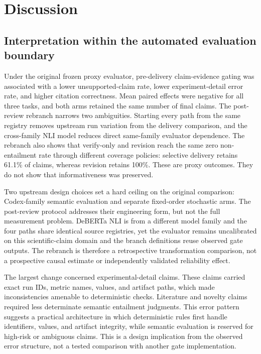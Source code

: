 \documentclass[11pt]{article}
\begin{document}
\section{Discussion}

\subsection{Interpretation within the automated evaluation boundary}

Under the original frozen proxy evaluator, pre-delivery claim-evidence gating was associated with a lower unsupported-claim rate, lower experiment-detail error rate, and higher citation correctness. Mean paired effects were negative for all three tasks, and both arms retained the same number of final claims. The post-review rebranch narrows two ambiguities. Starting every path from the same registry removes upstream run variation from the delivery comparison, and the cross-family NLI model reduces direct same-family evaluator dependence. The rebranch also shows that verify-only and revision reach the same zero non-entailment rate through different coverage policies: selective delivery retains 61.1\% of claims, whereas revision retains 100\%. These are proxy outcomes. They do not show that informativeness was preserved.

Two upstream design choices set a hard ceiling on the original comparison: Codex-family semantic evaluation and separate fixed-order stochastic arms. The post-review protocol addresses their engineering form, but not the full measurement problem. DeBERTa NLI is from a different model family and the four paths share identical source registries, yet the evaluator remains uncalibrated on this scientific-claim domain and the branch definitions reuse observed gate outputs. The rebranch is therefore a retrospective transformation comparison, not a prospective causal estimate or independently validated reliability effect.

The largest change concerned experimental-detail claims. These claims carried exact run IDs, metric names, values, and artifact paths, which made inconsistencies amenable to deterministic checks. Literature and novelty claims required less determinate semantic entailment judgments. This error pattern suggests a practical architecture in which deterministic rules first handle identifiers, values, and artifact integrity, while semantic evaluation is reserved for high-risk or ambiguous claims. This is a design implication from the observed error structure, not a tested comparison with another gate implementation.
\end{document}
